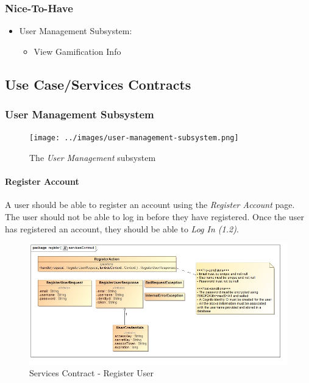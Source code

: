 \documentclass{article}
\let\cleardoublepage\clearpage
\begin{document}
		\subsubsection{Nice-To-Have}
		\begin{itemize}
			\item User Management Subsystem:
			\begin{itemize}
				\item View Gamification Info
			\end{itemize}
		\end{itemize}
	
\cleardoublepage

	\subsection{Use Case/Services Contracts}
		\subsubsection{User Management Subsystem}
			\begin{figure}[H]
				\centering
				\texttt{[image: ../images/user-management-subsystem.png]}
				\caption{The \emph{User Management} subsystem}
			\end{figure}
		\paragraph{Register Account}
			A user should be able to register an account using the \emph{Register Account} page. The user should not be able to log in before they have registered. Once the user has registered an account, they should be able to \emph{Log In (1.2)}.
			\begin{figure}[H]
				\includegraphics[width=\linewidth]{../images/ServicesContracts/register.jpg}
				\caption{Services Contract - Register User}
			\end{figure}
			
\end{document}
